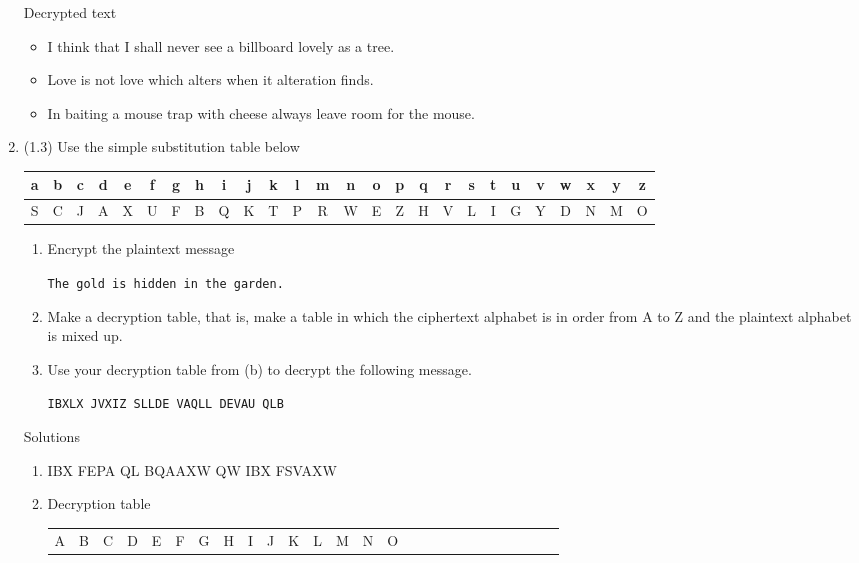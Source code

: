 \documentclass[12pt]{amsart}
\theoremstyle{definition}
\begin{document}
\begin{enumerate}
        Decrypted text
        \begin{itemize}
            \item I think that I shall never see a billboard lovely as a tree.
            \item Love is not love which alters when it alteration finds.
            \item In baiting a mouse trap with cheese always leave room for the mouse.
        \end{itemize}
	\item (1.3) Use the simple substitution table below
	\begin{center}
		\begin{tabular}{|c |c |c |c |c |c |c |c |c |c |c |c |c |c |c |c |c |c |c |c |c |c |c |c| c| c|}
			\hline
			a & b & c & d & e & f & g & h & i & j & k & l & m & n & o & 
			p & q & r & s & t & u & v & w & x & y & z \\
			\hline
			S & C & J & A & X & U & F & B & Q & K & T & P & R & W & E & 
			Z & H & V & L & I & G & Y & D & N & M & O \\
			\hline
		\end{tabular}
	\end{center}
	\begin{enumerate}
		\item Encrypt the plaintext message
		\begin{center}
			\texttt{The gold is hidden in the garden.}
		\end{center}
		\item Make a decryption table, that is, make a table in which the ciphertext 
			alphabet is in order from A to Z and the plaintext alphabet is mixed up.
		\item Use your decryption table from (b) to decrypt the following message.
		\begin{center}
			\texttt{IBXLX JVXIZ SLLDE VAQLL DEVAU QLB}
		\end{center}
	\end{enumerate}
        Solutions
        \begin{enumerate}
            \item IBX FEPA QL BQAAXW QW IBX FSVAXW
            \item Decryption table
                \begin{center}
                    \begin{tabular}{|c |c |c |c |c |c |c |c |c |c |c |c |c |c |c |c |c |c |c |c |c |c |c |c| c| c|}
        			\hline
        			A & B & C & D & E & F & G & H & I & J & K & L & M & N & O & 

\end{tabular}
\end{center}
\end{enumerate}
\end{enumerate}
\end{document}
